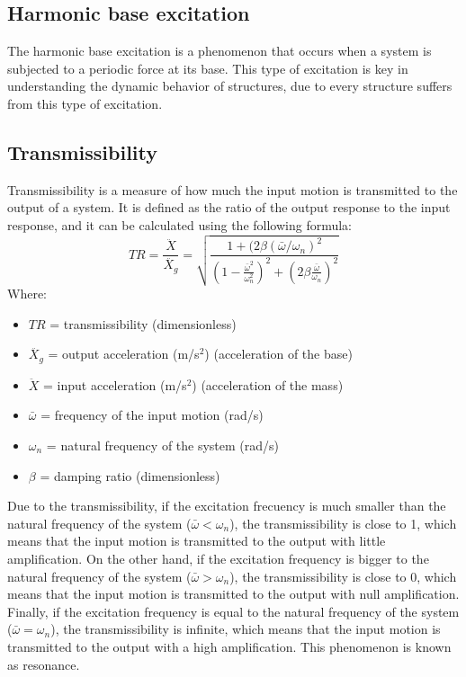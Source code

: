 \documentclass{article}  %
\begin{document}
\subsection{Harmonic base excitation}
The harmonic base excitation is a phenomenon that occurs when a system is subjected to a periodic force at its base. This type of excitation is key in understanding the dynamic behavior of structures, due to every structure suffers from this type of excitation. 

\subsection{Transmissibility}
Transmissibility is a measure of how much the input motion is transmitted to the output of a system. It is defined as the ratio of the output response to the input response, and it can be calculated using the following formula:
\begin{equation}
TR = \frac{\ddot{X}}{\ddot{X_g}} = \sqrt{\frac{1+(2 \beta (\bar{\omega}/\omega_n)^2}{(1 - \frac{\bar{\omega}^2}{\omega_n^2})^2 + (2\beta\frac{\bar{\omega}}{\omega_n})^2}} 
\end{equation}
Where:
\begin{itemize}
  \item $TR$ = transmissibility (dimensionless)
  \item $\ddot{X_g}$ = output acceleration (m/s$^2$) (acceleration of the base) 
  \item $\ddot{X}$ = input acceleration (m/s$^2$) (acceleration of the mass)
  \item $\bar{\omega}$ = frequency of the input motion (rad/s)
  \item $\omega_n$ = natural frequency of the system (rad/s)
  \item $\beta$ = damping ratio (dimensionless)
\end{itemize}

Due to the transmissibility, if the excitation frecuency is much smaller than the natural frequency of the system ($\bar{\omega} < \omega_n$), the transmissibility is close to 1, which means that the input motion is transmitted to the output with little amplification. On the other hand, if the excitation frequency is bigger to the natural frequency of the system ($\bar{\omega} > \omega_n$), the transmissibility is close to 0, which means that the input motion is transmitted to the output with null amplification. Finally, if the excitation frequency is equal to the natural frequency of the system ($\bar{\omega} = \omega_n$), the transmissibility is infinite, which means that the input motion is transmitted to the output with a high amplification. This phenomenon is known as resonance.
\end{document}
